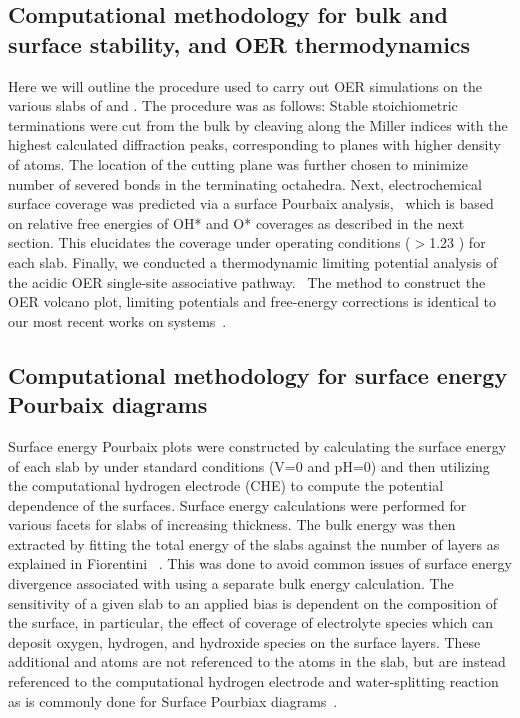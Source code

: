 \subsection{Computational methodology for bulk and surface stability, and OER thermodynamics}
%
%
Here we will outline the procedure used to carry out OER simulations on the various slabs of \IrOtwo and \IrOthree.
%
The procedure was as follows:
%
Stable stoichiometric terminations were cut from the bulk by cleaving along the Miller indices with the highest calculated diffraction peaks, corresponding to planes with higher density of atoms. The location of the cutting plane was further chosen to minimize number of severed bonds in the terminating octahedra. 
%
Next, electrochemical surface coverage was predicted via a surface Pourbaix analysis,~\cite{Lu2017} which is based on relative free energies of OH* and O* coverages as described in the next section. 
%
This elucidates the coverage under operating conditions ($>$\num{1.23} \VRHE) for each slab.
%
Finally, we conducted a thermodynamic limiting potential analysis of the acidic OER single-site associative pathway.~\cite{Rossmeisl2007, Man2011, Friebel2015,  Seitz2016, Strickler2019} The method to construct the OER volcano plot, limiting potentials and free-energy corrections is identical to our most recent works on \IrOtwo systems~\cite{Strickler2019,KHLee2020}.


\subsection{Computational methodology for surface energy Pourbaix diagrams}
%
%
Surface energy Pourbaix plots were constructed by calculating the surface energy of each slab by under standard conditions (\si{\volt}\num{=0} and pH\num{=0}) and then utilizing the computational hydrogen electrode (CHE) to compute the potential dependence of the surfaces.
%
Surface energy calculations were performed for various facets for slabs of increasing thickness.
%
The bulk energy was then extracted by fitting the total energy of the slabs against the number of layers as explained in Fiorentini ~\cite{Boettger1998}.
%
This was done to avoid common issues of surface energy divergence associated with using a separate bulk energy calculation.
%
The sensitivity of a given slab to an applied bias is dependent on the composition of the surface,
in particular, the effect of coverage of electrolyte species which can deposit oxygen, hydrogen, and hydroxide species on the surface layers.
%
These additional  and  atoms are not referenced to the atoms in the slab, but are instead referenced to the computational hydrogen electrode and water-splitting reaction as is commonly done for Surface Pourbiax diagrams~\cite{Lu2017}. 


